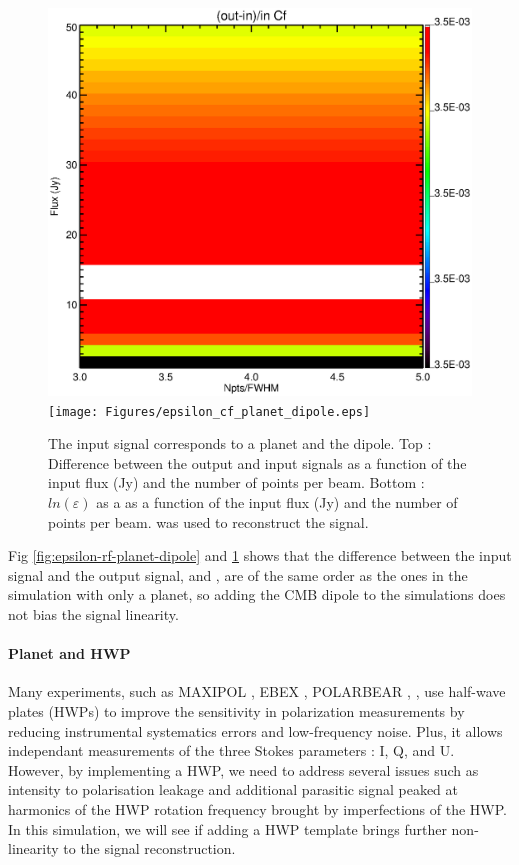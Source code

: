 \begin{figure}[h]
\center
	\includegraphics[scale=0.2]{Figures/diff_cf_planet_dipole.eps}
	\texttt{[image: Figures/epsilon\_cf\_planet\_dipole.eps]}
	\caption{The input signal corresponds to a planet and the dipole. Top : Difference between the output and input signals as a function of the input flux (Jy) and the number of points per beam. Bottom : $ln(\varepsilon)$ as a as a function of the input flux (Jy) and the number of points per beam. \cf was used to reconstruct the signal.}
	\label{fig:epsilon-cf-planet-dipole}
\end{figure}

Fig \ref{fig:epsilon-rf-planet-dipole} and \ref{fig:epsilon-cf-planet-dipole} shows that the difference between the input signal and the output signal, and \eps, are of the same order as the ones in the simulation with only a planet, so adding the CMB dipole to the simulations does not bias the signal linearity. 

\paragraph{Planet and HWP \\} 

Many experiments, such as MAXIPOL \citep{2007ApJ...665...42J}, EBEX \citep{2010SPIE.7741E..1CR}, POLARBEAR \citep{2017JCAP...05..008T},  \citep{2017A&A...599A..34R}, use half-wave plates (HWPs) to improve the sensitivity in polarization measurements by reducing instrumental systematics errors and low-frequency noise. Plus, it allows independant measurements of the three Stokes parameters : I, Q, and U. However, by implementing a HWP, we need to address several issues such as intensity to polarisation leakage and additional parasitic signal peaked at harmonics of the HWP rotation frequency brought by imperfections of the HWP.\\
In this simulation, we will see if adding a HWP template brings further non-linearity to the signal reconstruction. 

